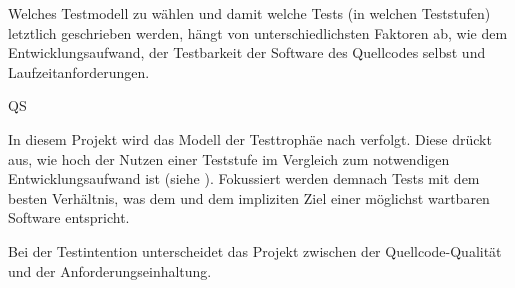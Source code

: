 Welches Testmodell zu wählen und damit welche Tests (in welchen Teststufen) letztlich geschrieben werden, hängt von unterschiedlichsten Faktoren ab, wie \zB dem Entwicklungsaufwand, der Testbarkeit der Software \bzw des Quellcodes selbst und Laufzeitanforderungen.

\begin{enumerateWithCode}{QS}
    \item In diesem Projekt wird das Modell der Testtrophäe nach  verfolgt.
    Diese drückt aus, wie hoch der Nutzen einer Teststufe im Vergleich zum notwendigen Entwicklungsaufwand ist
    (siehe ).
    Fokussiert werden demnach Tests mit dem besten Verhältnis, was dem  und dem impliziten Ziel einer möglichst wartbaren Software entspricht.

    \item Bei der Testintention unterscheidet das Projekt zwischen der Quellcode-Qualität und der Anforderungseinhaltung.
\end{enumerateWithCode}

